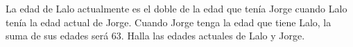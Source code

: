 La edad de Lalo actualmente es el doble de la edad que tenía Jorge cuando Lalo tenía la edad actual de Jorge. Cuando Jorge tenga la edad que tiene Lalo, la suma de sus edades será $63$. Halla las edades actuales de Lalo y Jorge.